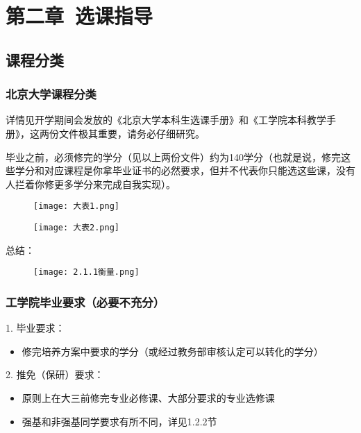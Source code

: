 \documentclass[11pt,oneside]{book}
\begin{document}
\chapter{第二章\ 选课指导}
\section{课程分类}
\subsection{北京大学课程分类}
详情见开学期间会发放的《北京大学本科生选课手册》和《工学院本科教学手册》，这两份文件极其重要，请务必仔细研究。

毕业之前，必须修完的学分（见以上两份文件）约为140学分（也就是说，修完这些学分和对应课程是你拿毕业证书的必然要求，但并不代表你只能选这些课，没有人拦着你修更多学分来完成自我实现）。

\begin{figure}[htbp]
    \centering
    \texttt{[image: 大表1.png]}
\end{figure}

\begin{figure}[htbp]
    \centering
    \texttt{[image: 大表2.png]}
\end{figure}



总结：
\begin{figure}[htbp]
    \centering
    \texttt{[image: 2.1.1衡量.png]}
\end{figure}

\subsection{工学院毕业要求（必要不充分）}
1. 毕业要求：

\begin{itemize}
    \item 修完培养方案中要求的学分（或经过教务部审核认定可以转化的学分）
\end{itemize}

2. 推免（保研）要求：

\begin{itemize}
    \item 原则上在大三前修完专业必修课、大部分要求的专业选修课
    \item 强基和非强基同学要求有所不同，详见1.2.2节
\end{itemize}
\end{document}
